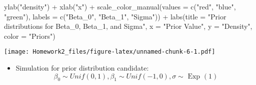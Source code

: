 \documentclass[
]{article}
\newenvironment{Shaded}{\begin{snugshade}}{\end{snugshade}}
\newcommand{\AttributeTok}[1]{\textcolor[rgb]{0.77,0.63,0.00}{#1}}
\newcommand{\FunctionTok}[1]{\textcolor[rgb]{0.00,0.00,0.00}{#1}}
\newcommand{\NormalTok}[1]{#1}
\newcommand{\SpecialCharTok}[1]{\textcolor[rgb]{0.00,0.00,0.00}{#1}}
\newcommand{\StringTok}[1]{\textcolor[rgb]{0.31,0.60,0.02}{#1}}
\providecommand{\tightlist}{%
  \setlength{\itemsep}{0pt}\setlength{\parskip}{0pt}}
\begin{document}
\begin{Shaded}
\begin{Highlighting}[]
  \FunctionTok{ylab}\NormalTok{(}\StringTok{"density"}\NormalTok{) }\SpecialCharTok{+} 
  \FunctionTok{xlab}\NormalTok{(}\StringTok{"x"}\NormalTok{) }\SpecialCharTok{+} 
  \FunctionTok{scale\_color\_manual}\NormalTok{(}\AttributeTok{values =} \FunctionTok{c}\NormalTok{(}\StringTok{"red"}\NormalTok{, }\StringTok{"blue"}\NormalTok{, }\StringTok{"green"}\NormalTok{), }
                     \AttributeTok{labels =} \FunctionTok{c}\NormalTok{(}\StringTok{"Beta\_0"}\NormalTok{, }\StringTok{"Beta\_1"}\NormalTok{, }\StringTok{"Sigma"}\NormalTok{)) }\SpecialCharTok{+}
  \FunctionTok{labs}\NormalTok{(}\AttributeTok{title =} \StringTok{"Prior distributions for Beta\_0, Beta\_1, and Sigma"}\NormalTok{,}
       \AttributeTok{x =} \StringTok{"Prior Value"}\NormalTok{,}
       \AttributeTok{y =} \StringTok{"Density"}\NormalTok{,}
       \AttributeTok{color =} \StringTok{"Priors"}\NormalTok{)}
\end{Highlighting}
\end{Shaded}

\texttt{[image: Homework2\_files/figure-latex/unnamed-chunk-6-1.pdf]}

\begin{itemize}
\tightlist
\item
  Simulation for prior distribution candidate: \[\begin{equation}
  \beta_0 \sim Unif\left(0, 1\right), \beta_1 \sim Unif\left(-1, 0\right), \sigma \sim \text { Exp }(1)
  \end{equation}\]
\end{itemize}
\end{document}

